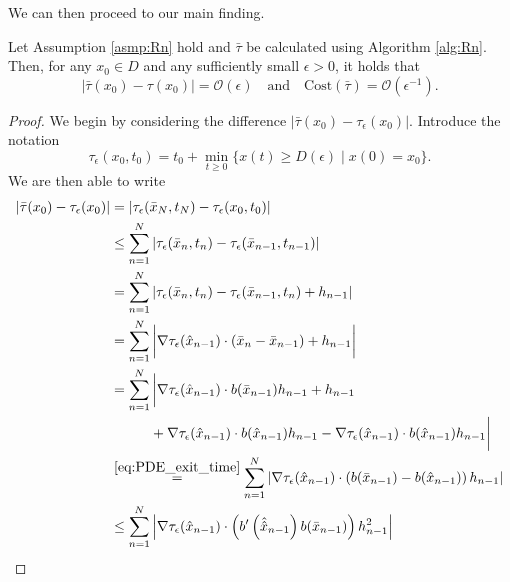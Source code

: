 \documentclass[a4paper, oneside, reqno]{amsart}
\newcommand{\abs}[1]{\left\lvert#1\right\rvert}
\theoremstyle{remark}
\begin{document}
We can then proceed to our main finding. 
\begin{theorem}
\label{thm:propertiesAlgRn}
    Let Assumption \ref{asmp:Rn} hold and \(\bar\tau\) be calculated using Algorithm \ref{alg:Rn}. 
    Then, for any \(x_0 \in D\) and any sufficiently small \(\epsilon>0\), it holds that
    \begin{equation*}
    \abs{\bar\tau(x_0)-\tau(x_0)} = \mathcal{O}\left(\epsilon\right)
    \quad \text{and} \quad \mathrm{Cost}(\bar \tau) = \mathcal{O}(\epsilon^{-1}). 
\end{equation*} 
\end{theorem}
\begin{proof}
We begin by considering the difference \(\abs{\bar\tau(x_0)-\tau_\epsilon(x_0)}\). Introduce the notation 
\[\tau_\epsilon(x_0, t_0) = t_0 + \underset{t \geq 0}{\min}\{x(t) \geq D(\epsilon) \mid x(0) = x_0\}.\]
We are then able to write 
\begingroup 
\allowdisplaybreaks
\begin{align}
\label{eq:boundHD}
    \abs{\bar\tau(x_0)-\tau_\epsilon(x_0)} &= \abs{\tau_\epsilon(\bar x_N, t_N)-\tau_\epsilon(x_0, t_0)} \nonumber \\
                          &\leq \sum_{n=1}^{N}\abs{\tau_\epsilon(\bar x_n, t_n) - \tau_\epsilon(\bar x_{n-1}, t_{n-1})} \nonumber\\
                          &= \sum_{n=1}^{N}\abs{\tau_\epsilon(\bar x_n, t_n) - \tau_\epsilon(\bar x_{n-1}, t_{n}) + h_{n-1}} \nonumber\\
                          &= \sum_{n=1}^{N}\bigg\vert \nabla\tau_\epsilon(\hat x_{n-1})\cdot(\bar x_n - \bar x_{n-1}) + h_{n-1} \bigg\vert \nonumber\\
                          &= \sum_{n=1}^{N}\bigg\vert\nabla\tau_\epsilon(\hat x_{n-1})\cdot b(\bar x_{n-1})h_{n-1} + h_{n-1} \nonumber \\
                          &\hspace{10mm}+\nabla\tau_\epsilon(\hat x_{n-1})\cdot b(\hat x_{n-1})h_{n-1} - \nabla\tau_\epsilon(\hat x_{n-1})\cdot b(\hat x_{n-1})h_{n-1}\bigg\vert \nonumber\\
                          &\overset{\eqref{eq:PDE_exit_time}}{=} \sum_{n=1}^{N}\abs{\nabla\tau_\epsilon(\hat x_{n-1})\cdot\left(b(\bar x_{n-1})-b(\hat x_{n-1})\right)h_{n-1}} \nonumber \\
                          &\leq \sum_{n=1}^{N}\abs{\nabla\tau_\epsilon(\hat x_{n-1})\cdot \left(b'\left(\hat{\hat{x}}_{n-1}\right)b(\bar x_{n-1})\right)h_{n-1}^2} \nonumber \\

\end{align}
\end{proof}
\end{document}
